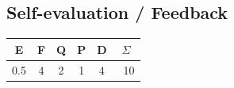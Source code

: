 \documentclass{article}
\begin{document}
    \subsection{Self-evaluation / Feedback}
    \begin{center}
        \begin{tabular}{ |c|c|c|c|c|c| } 
             \hline
                 \textbf{E} & \textbf{F} & \textbf{Q} & \textbf{P} & \textbf{D} & \textbf{$\Sigma$}\\ 
             \hline \hline
                 0.5 & 4 & 2 & 1 & 4 & ~10 \\ 
             \hline
        \end{tabular}
    \end{center}
    
    \clearpage
\end{document}
